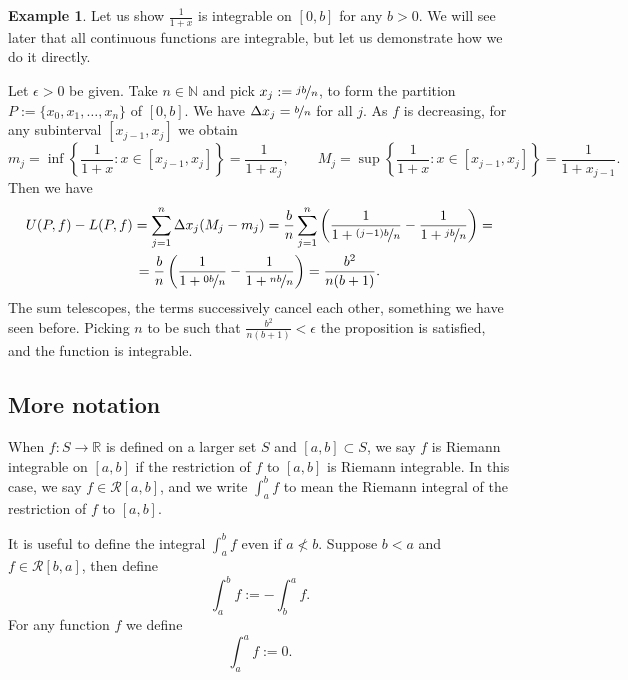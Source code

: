 \documentclass[12pt]{book}
\newcommand{\R}{{\mathbb{R}}}
\newcommand{\N}{{\mathbb{N}}}
\newcommand{\sR}{{\mathcal{R}}}
\theoremstyle{plain}
\theoremstyle{remark}
\theoremstyle{definition}
\theoremstyle{exercise}
\theoremstyle{example}
\newtheorem{example}[thm]{Example}
\begin{document}
\begin{example}
Let us show $\frac{1}{1+x}$ is integrable on $[0,b]$ for any $b > 0$.
We will see later that all continuous functions are integrable, but let us
demonstrate how we do it directly.

Let $\epsilon > 0$ be given.  Take $n \in \N$ and
pick $x_j := \nicefrac{jb}{n}$, to form the 
partition $P := \{ x_0,x_1,\ldots,x_n \}$ of $[0,b]$.
We have $\Delta x_j = \nicefrac{b}{n}$ for all $j$.  
As $f$ is decreasing, for any subinterval $[x_{j-1},x_j]$ we obtain
\begin{equation*}
m_j = \inf \left\{ \frac{1}{1+x} : x \in [x_{j-1},x_j] \right\} = \frac{1}{1+x_j} ,
\qquad
M_j = \sup \left\{ \frac{1}{1+x} : x \in [x_{j-1},x_j] \right\} =
\frac{1}{1+x_{j-1}} .
\end{equation*}
Then we have
\begin{multline*}
U(P,f)-L(P,f)
=
\sum_{j=1}^n
\Delta x_j
(M_j-m_j)
=
\frac{b}{n}
\sum_{j=1}^n 
\left( \frac{1}{1+\nicefrac{(j-1)b}{n}} - \frac{1}{1+\nicefrac{jb}{n}} \right) 
=
\\
=
\frac{b}{n}
\left( \frac{1}{1+\nicefrac{0b}{n}} - \frac{1}{1+\nicefrac{nb}{n}} \right) 
=
\frac{b^2}{n(b+1)} .
\end{multline*}
The sum telescopes, the terms successively cancel each other, something
we have seen before.
Picking $n$ to be such that
$\frac{b^2}{n(b+1)} < \epsilon$ the proposition is satisfied, and the
function is integrable.
\end{example}

\subsection{More notation}

When $f \colon S \to \R$ is defined on a larger set $S$ and
$[a,b] \subset S$,
we say $f$ is Riemann integrable on $[a,b]$ if the restriction of $f$
to $[a,b]$ is Riemann integrable. 
In this case,
we say $f \in \sR[a,b]$,
and
we write $\int_a^b f$ to mean the Riemann integral
of the restriction of $f$ to $[a,b]$.

It is useful to define the integral $\int_a^b f$ even if
$a \not< b$.  Suppose $b < a$ and $f \in \sR[b,a]$,
then define
\begin{equation*}
\int_a^b f := - \int_b^a f .
\end{equation*}
For any function $f$ we define
\begin{equation*}
\int_a^a f := 0 .
\end{equation*}
\end{document}
